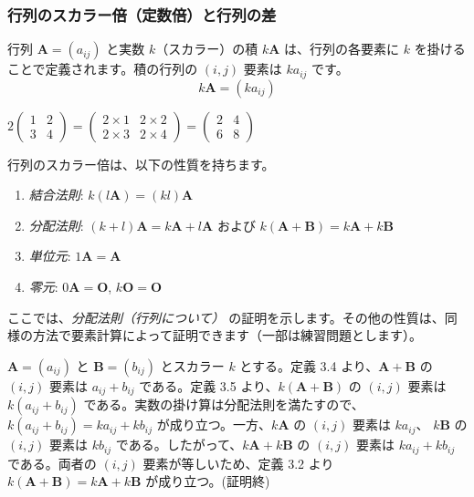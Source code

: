 \subsubsection{行列のスカラー倍（定数倍）と行列の差}
\begin{dfn}[行列のスカラー倍]
行列 $\bm{A} = (a_{ij})$ と実数 $k$（スカラー）の積 $k\bm{A}$ は、行列の各要素に $k$ を掛けることで定義されます。積の行列の $(i,j)$ 要素は $k a_{ij}$ です。
\[k\bm{A} = (k a_{ij})\]
\end{dfn}
\begin{ex}
$2 \begin{pmatrix} 1 & 2 \\ 3 & 4 \end{pmatrix} = \begin{pmatrix} 2 \times 1 & 2 \times 2 \\ 2 \times 3 & 2 \times 4 \end{pmatrix} = \begin{pmatrix} 2 & 4 \\ 6 & 8 \end{pmatrix}$
\end{ex}
\begin{thm}[行列のスカラー倍の性質]
行列のスカラー倍は、以下の性質を持ちます。
\begin{enumerate}
\item \emph{結合法則}: $k(l\bm{A}) = (kl)\bm{A}$
\item \emph{分配法則}: $(k+l)\bm{A} = k\bm{A} + l\bm{A}$ および $k(\bm{A}+\bm{B}) = k\bm{A} + k\bm{B}$
\item \emph{単位元}: $1\bm{A} = \bm{A}$
\item \emph{零元}: $0\bm{A} = \bm{O}$, $k\bm{O} = \bm{O}$
\end{enumerate}
\begin{proof*}
ここでは、\emph{分配法則（行列について）} の証明を示します。その他の性質は、同様の方法で要素計算によって証明できます（一部は練習問題とします）。\par
$\bm{A} = (a_{ij})$ と $\bm{B} = (b_{ij})$ とスカラー $k$ とする。定義 3.4 より、$\bm{A} + \bm{B}$ の $(i,j)$ 要素は $a_{ij} + b_{ij}$ である。定義 3.5 より、$k(\bm{A} + \bm{B})$ の $(i,j)$ 要素は $k(a_{ij} + b_{ij})$ である。実数の掛け算は分配法則を満たすので、$k(a_{ij} + b_{ij}) = k a_{ij} + k b_{ij}$ が成り立つ。一方、$k\bm{A}$ の $(i,j)$ 要素は $k a_{ij}$、 $k\bm{B}$ の $(i,j)$ 要素は $k b_{ij}$ である。したがって、$k\bm{A} + k\bm{B}$ の $(i,j)$ 要素は $k a_{ij} + k b_{ij}$ である。両者の $(i,j)$ 要素が等しいため、定義 3.2 より $k(\bm{A}+\bm{B}) = k\bm{A} + k\bm{B}$ が成り立つ。(証明終)
\end{proof*}
\end{thm}

